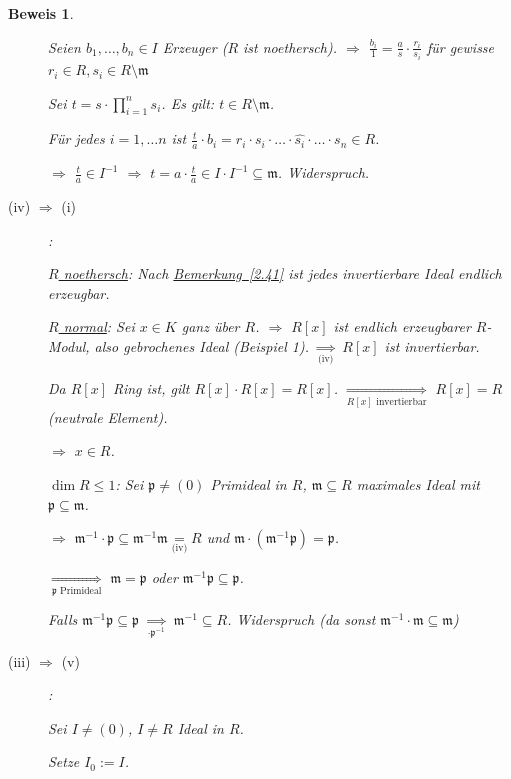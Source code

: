 \documentclass[a4paper,12pt]{scrbook}
\theoremstyle{break}
\theoremstyle{nonumberbreak}
\newtheorem{Bew}{Beweis}
\theoremstyle{nonumberplain}
\newcommand{\myref}[2]{%
\hyperref[#2]{#1~\ref*{#2}}%
}
\begin{document}
\begin{Bew}
\begin{description}
Seien $b_1, \ldots, b_n \in I$ Erzeuger ($R$ ist noethersch). $\Rightarrow$ $\frac{b_i}{1} = \frac{a}{s} \cdot \frac{r_i}{s_i}$ für gewisse $r_i \in R, s_i \in R \setminus \mathfrak{m}$

Sei $t = s \cdot \prod_{i=1}^{n} s_i$. Es gilt: $t \in R \setminus \mathfrak{m}$.

Für jedes $i = 1, \ldots n$ ist $\frac{t}{a} \cdot b_i = r_i \cdot s_i \cdot \ldots \cdot \widehat{s_i} \cdot \ldots \cdot s_n \in R$.

$\Rightarrow$ $\frac{t}{a} \in I^{-1}$ $\Rightarrow$ $t = a \cdot \frac{t}{a} \in I \cdot I^{-1} \subseteq \mathfrak{m}$. Widerspruch.

\item[(iv) $\Rightarrow$ (i)]:

\underline{$R$ noethersch}: Nach \myref{Bemerkung}{2.41} ist jedes invertierbare Ideal endlich erzeugbar.

\underline{$R$ normal}: Sei $x \in K$ ganz über $R$. $\Rightarrow$ $R[x]$ ist endlich erzeugbarer $R$-Modul, also gebrochenes Ideal (Beispiel 1). $\underset{\text{(iv)}}{\Rightarrow}$ $R[x]$ ist invertierbar. 

Da $R[x]$ Ring ist, gilt $R[x] \cdot R[x] = R[x]$. $\underset{R[x]\text{ invertierbar}}{\Longrightarrow}$ $R[x] = R$ (neutrale Element).

$\Rightarrow$ $x \in R$.

\underline{$\dim R \leq 1$}: Sei $\mathfrak{p} \neq (0)$ Primideal in $R$, $\mathfrak{m} \subseteq R$ maximales Ideal mit $\mathfrak{p} \subseteq \mathfrak{m}$.

$\Rightarrow$ $\mathfrak{m}^{-1} \cdot \mathfrak{p} \subseteq \mathfrak{m}^{-1} \mathfrak{m} \underset{\text{(iv)}}{=} R$ und $\mathfrak{m} \cdot (\mathfrak{m}^{-1} \mathfrak{p}) = \mathfrak{p}$.

$\underset{\mathfrak{p}\text{ Primideal}}{\Longrightarrow}$ $\mathfrak{m} = \mathfrak{p}$ oder $\mathfrak{m}^{-1} \mathfrak{p} \subseteq \mathfrak{p}$.

Falls $\mathfrak{m}^{-1} \mathfrak{p} \subseteq \mathfrak{p}$ $\underset{\cdot \mathfrak{p}^{-1}}{\Rightarrow}$ $\mathfrak{m}^{-1} \subseteq R$. Widerspruch (da sonst $\mathfrak{m}^{-1} \cdot \mathfrak{m} \subseteq \mathfrak{m}$)

\item[(iii) $\Rightarrow$ (v)]:

Sei $I \neq (0)$, $I \neq R$ Ideal in $R$.

Setze $I_0 := I$.


\end{description}
\end{Bew}
\end{document}
